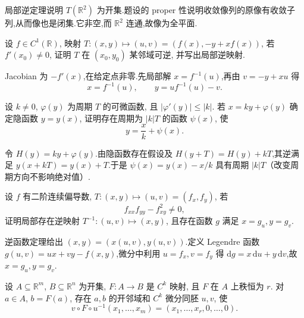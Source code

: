 \begin{solution}
    局部逆定理说明 $T(\mathbb R^2)$ 为开集.题设的 proper 性说明收敛像列的原像有收敛子列,从而像也是闭集.它非空,而 $\mathbb R^2$ 连通,故像为全平面.
\end{solution}

\begin{example}
    设 $f\in C^1(\mathbb{R})$, 映射 $T:(x,y)\mapsto(u,v)=(f(x),-y+xf(x))$, 若 $f'(x_0)\ne0$, 证明 $T$ 在 $(x_0,y_0)$ 某邻域可逆, 并写出局部逆映射.
\end{example}
\exampleblank

\begin{solution}
    Jacobian 为 $-f'(x)$,在给定点非零.先局部解 $x=f^{-1}(u)$,再由 $v=-y+xu$ 得
    \[
        x=f^{-1}(u),\qquad y=u f^{-1}(u)-v.
    \]
\end{solution}

\begin{example}
    设 $k\ne0$, $\varphi(y)$ 为周期 $T$ 的可微函数, 且 $|\varphi'(y)|\leq|k|$. 若 $x=ky+\varphi(y)$ 确定隐函数 $y=y(x)$, 证明存在周期为 $|k|T$ 的函数 $\psi(x)$, 使
    \[
        y=\dfrac{x}{k}+\psi(x).
    \]
\end{example}
\exampleblank

\begin{solution}
    令 $H(y)=ky+\varphi(y)$.由隐函数存在假设及 $H(y+T)=H(y)+kT$,其逆满足 $y(x+kT)=y(x)+T$.于是 $\psi(x)=y(x)-x/k$ 具有周期 $|k|T$（改变周期方向不影响绝对值）.
\end{solution}

\begin{example}
    设 $f$ 有二阶连续偏导数, $T:(x,y)\mapsto(u,v)=(f_x,f_y)$, 若
    \[
        f_{xx}f_{yy}-f_{xy}^2\ne0,
    \]
    证明局部存在逆映射 $T^{-1}:(u,v)\mapsto(x,y)$, 且存在函数 $g$ 满足 $x=g_u,y=g_v$.
\end{example}
\exampleblank

\begin{solution}
    逆函数定理给出 $(x,y)=(x(u,v),y(u,v))$.定义 Legendre 函数
    $g(u,v)=ux+vy-f(x,y)$,微分中利用 $u=f_x,v=f_y$ 得 $\mathrm dg=x\,\mathrm du+y\,\mathrm dv$,故 $x=g_u,y=g_v$.
\end{solution}




\begin{theorem}
    设 $A\subseteq\mathbb{R}^m$, $B\subseteq\mathbb{R}^n$ 为开集, $F:A\to B$ 是 $C^k$ 映射, 且 $F$ 在 $A$ 上秩恒为 $r$. 对 $a\in A$, $b=F(a)$, 存在 $a,b$ 的开邻域和 $C^k$ 微分同胚 $u,v$, 使
    \[
        v\circ F\circ u^{-1}(x_1,\ldots,x_m)
        =(x_1,\ldots,x_r,0,\ldots,0).
    \]
\end{theorem}

